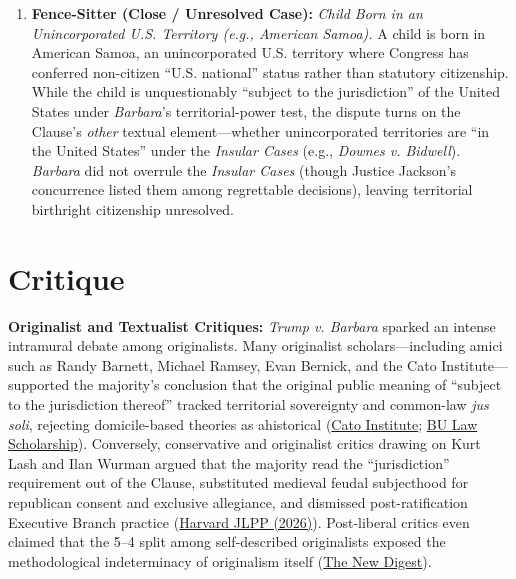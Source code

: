 \documentclass[12pt]{article}
\begin{document}
\begin{enumerate}
\item \textbf{Fence-Sitter (Close / Unresolved Case):} \textit{Child Born in an Unincorporated U.S. Territory (e.g., American Samoa).} A child is born in American Samoa, an unincorporated U.S. territory where Congress has conferred non-citizen ``U.S. national'' status rather than statutory citizenship. While the child is unquestionably ``subject to the jurisdiction'' of the United States under \textit{Barbara}'s territorial-power test, the dispute turns on the Clause's \textit{other} textual element---whether unincorporated territories are ``in the United States'' under the \textit{Insular Cases} (e.g., \textit{Downes v. Bidwell}). \textit{Barbara} did not overrule the \textit{Insular Cases} (though Justice Jackson's concurrence listed them among regrettable decisions), leaving territorial birthright citizenship unresolved.
\end{enumerate}

\section{Critique}
\textbf{Originalist and Textualist Critiques:} \textit{Trump v. Barbara} sparked an intense intramural debate among originalists. Many originalist scholars---including amici such as Randy Barnett, Michael Ramsey, Evan Bernick, and the Cato Institute---supported the majority's conclusion that the original public meaning of ``subject to the jurisdiction thereof'' tracked territorial sovereignty and common-law \textit{jus soli}, rejecting domicile-based theories as ahistorical (\href{https://www.cato.org/legal-briefs/trump-v-barbara}{Cato Institute}; \href{https://scholarship.law.bu.edu/cgi/viewcontent.cgi?article=5201&context=faculty_scholarship}{BU Law Scholarship}). Conversely, conservative and originalist critics drawing on Kurt Lash and Ilan Wurman argued that the majority read the ``jurisdiction'' requirement out of the Clause, substituted medieval feudal subjecthood for republican consent and exclusive allegiance, and dismissed post-ratification Executive Branch practice (\href{https://journals.law.harvard.edu/jlpp/wp-content/uploads/sites/90/2026/09/Wessan-BirthrightCitizenshipSymposium-Final.pdf}{Harvard JLPP (2026)}). Post-liberal critics even claimed that the 5--4 split among self-described originalists exposed the methodological indeterminacy of originalism itself (\href{https://thenewdigest.substack.com/p/trump-v-barbara-and-the-end-of-originalism}{The New Digest}).
\end{document}
